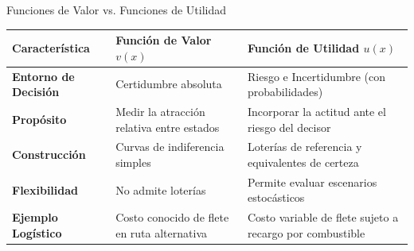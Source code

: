 \documentclass[aspectratio=169, 10pt]{beamer}
\begin{document}
\begin{frame}{Funciones de Valor vs. Funciones de Utilidad}
    \begin{table}
        \centering
        \scriptsize
        \begin{tabular}{lll}
            \toprule
            \textbf{Característica} & \textbf{Función de Valor $v(x)$} & \textbf{Función de Utilidad $u(x)$} \\
            \midrule
            \textbf{Entorno de Decisión} & Certidumbre absoluta & Riesgo e Incertidumbre (con probabilidades) \\
            \textbf{Propósito} & Medir la atracción relativa entre estados & Incorporar la actitud ante el riesgo del decisor \\
            \textbf{Construcción} & Curvas de indiferencia simples & Loterías de referencia y equivalentes de certeza \\
            \textbf{Flexibilidad} & No admite loterías & Permite evaluar escenarios estocásticos \\
            \textbf{Ejemplo Logístico} & Costo conocido de flete en ruta alternativa & Costo variable de flete sujeto a recargo por combustible \\
            \bottomrule
        \end{tabular}
    \end{table}
\end{frame}
\end{document}

